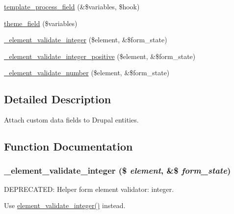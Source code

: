 \begin{DoxyCompactItemize}
\hyperlink{group__field_ga4fd3ce05ef61810b1f66283302ab7cad}{template\_\-process\_\-field} (\&\$variables, \$hook)
\item 
\hyperlink{group__themeable_gaee35966f09683ab054aef8f6fd022d2c}{theme\_\-field} (\$variables)
\item 
\hyperlink{field_8module_af34002ccec2a5ae0697cc23cac5cf9f1}{\_\-element\_\-validate\_\-integer} (\$element, \&\$form\_\-state)
\item 
\hyperlink{field_8module_a8a204417f7ec4289d828b223afa22c57}{\_\-element\_\-validate\_\-integer\_\-positive} (\$element, \&\$form\_\-state)
\item 
\hyperlink{field_8module_a95595f737604fea8bffc695d064f2b67}{\_\-element\_\-validate\_\-number} (\$element, \&\$form\_\-state)
\end{DoxyCompactItemize}


\subsection{Detailed Description}
Attach custom data fields to Drupal entities. 

\subsection{Function Documentation}
\hypertarget{field_8module_af34002ccec2a5ae0697cc23cac5cf9f1}{
\subsubsection[{\_\-element\_\-validate\_\-integer}]{\setlength{\rightskip}{0pt plus 5cm}\_\-element\_\-validate\_\-integer (\$ {\em element}, \/  \&\$ {\em form\_\-state})}}
\label{field_8module_af34002ccec2a5ae0697cc23cac5cf9f1}
DEPRECATED: Helper form element validator: integer.

Use \hyperlink{group__form__api_ga6fffa62178c1fc94329e142b083e9b1c}{element\_\-validate\_\-integer()} instead.

